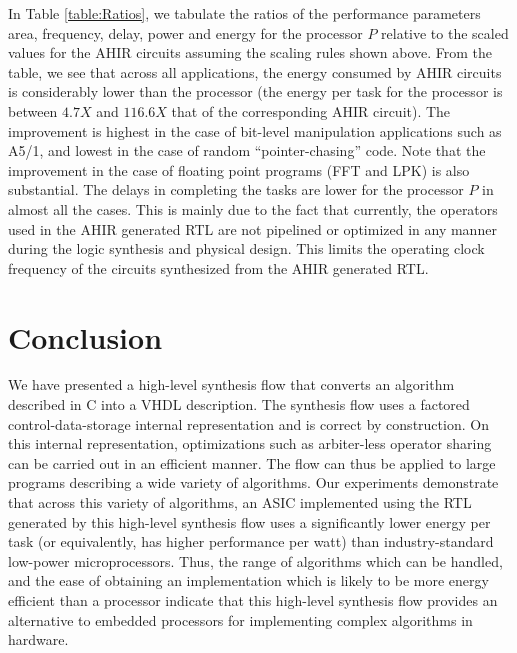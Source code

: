 \documentclass[conference]{IEEEtran}
\begin{document}
In Table \ref{table:Ratios}, we tabulate the ratios of
the performance parameters area, frequency, delay, power
and energy for the processor $P$ relative to the scaled values
for the AHIR circuits assuming the scaling rules shown above.
From the table, we see that across all applications, the energy consumed
by AHIR circuits is considerably lower than the
processor (the energy per task for the processor is
between $4.7X$ and $116.6X$ that of the corresponding AHIR circuit).  
The improvement is highest in the case of
bit-level manipulation applications such as A5/1, and
lowest in the case of random ``pointer-chasing'' code.  Note
that the improvement in the
case of  floating point programs (FFT and LPK) is also
substantial.
The delays in completing the tasks are lower 
for the processor $P$ in almost all the cases.  This
is mainly due to the fact that currently, the operators used in 
the AHIR generated RTL are not pipelined or optimized in any
manner during the logic synthesis and physical
design. This limits the operating clock frequency of the circuits
synthesized from the AHIR generated RTL.  

\section{Conclusion}

We have presented a high-level synthesis flow that converts
an algorithm described in C into a VHDL description.  The
synthesis flow uses a factored control-data-storage internal representation
and is correct by construction.  On this internal
representation, optimizations such as arbiter-less operator sharing 
can be carried out in an efficient manner.  The flow can thus
be applied to large programs describing a wide variety of algorithms.
Our experiments demonstrate that across this variety of
algorithms, an ASIC
implemented using the RTL generated by this high-level
synthesis flow uses a significantly lower energy per task (or equivalently,
has higher performance per watt) than industry-standard low-power microprocessors. 
Thus, the range of algorithms
which can be handled, and the ease of obtaining an implementation
which is likely to be more energy efficient than a processor 
indicate that this high-level synthesis flow provides an 
alternative to embedded processors for implementing complex algorithms in hardware.



\end{document}
